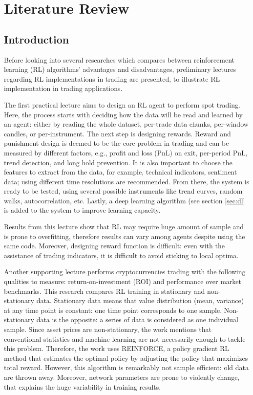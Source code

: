 \chapter{Literature Review}
\label{Literature Review}

\section{Introduction}
Before looking into several researches which compares between reinforcement learning (RL) algorithms' advantages and disadvantages, preliminary lectures regarding RL implementations in trading are presented, to illustrate RL implementation in trading applications.

The first practical lecture \cite{LV90} aims to design an RL agent to perform spot trading. Here, the process starts with deciding how the data will be read and learned by an agent: either by reading the whole dataset, per-trade data chunks, per-window candles, or per-instrument. The next step is designing rewards. Reward and punishment design is deemed to be the core problem in trading and can be measured by different factors, e.g., profit and loss (PnL) on exit, per-period PnL, trend detection, and long hold prevention. It is also important to choose the features to extract from the data, for example, technical indicators, sentiment data; using different time resolutions are recommended. From there, the system is ready to be tested, using several possible instruments like trend curves, random walks, autocorrelation, etc. Lastly, a deep learning algorithm (see section \ref{sec:dl} is added to the system to improve learning capacity.

Results from this lecture show that RL may require huge amount of sample and is prone to overfitting, therefore results can vary among agents despite using the same code. Moreover, designing reward function is difficult: even with the assistance of trading indicators, it is difficult to avoid sticking to local optima. 

Another supporting lecture \cite{LV91} performs cryptocurrencies trading with the following qualities to measure: return-on-investment (ROI) and performance over market benchmarks. This research compares RL training in stationary and non-stationary data. Stationary data means that value distribution (mean, variance) at any time point is constant: one time point corresponds to one sample. Non-stationary data is the opposite: a series of data is considered as one individual sample. Since asset prices are non-stationary, the work mentions that conventional statistics and machine learning are not necessarily enough to tackle this problem. Therefore, the work uses REINFORCE, a policy gradient RL method that estimates the optimal policy by adjusting the policy that maximizes total reward. However, this algorithm is remarkably not sample efficient: old data are thrown away. Moreover, network parameters are prone to violently change, that explains the huge variability in training results.

